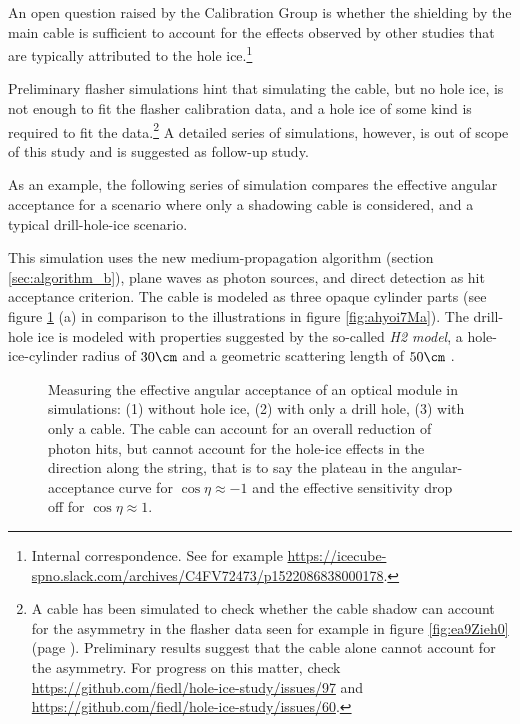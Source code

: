 An open question raised by the \icecube Calibration Group is whether the shielding by the main cable is sufficient to account for the effects observed by other studies that are typically attributed to the hole ice.\footnote{Internal correspondence. See for example \url{https://icecube-spno.slack.com/archives/C4FV72473/p1522086838000178}.}

Preliminary flasher simulations hint that simulating the cable, but no hole ice, is not enough to fit the flasher calibration data, and a hole ice of some kind is required to fit the data.\footnote{A cable has been simulated to check whether the cable shadow can account for the asymmetry in the flasher data seen for example in figure \ref{fig:ea9Zieh0} (page \pageref{fig:ea9Zieh0}). Preliminary results suggest that the cable alone cannot account for the asymmetry. For progress on this matter, check \url{https://github.com/fiedl/hole-ice-study/issues/97} and \url{https://github.com/fiedl/hole-ice-study/issues/60}.} A detailed series of simulations, however, is out of scope of this study and is suggested as follow-up study.\followup

As an example, the following series of simulation compares the effective angular acceptance for a scenario where only a shadowing cable is considered, and a typical drill-hole-ice scenario.


This simulation uses the new medium-propagation algorithm (section \ref{sec:algorithm_b}), plane waves as photon sources, and direct detection as hit acceptance criterion. The cable is modeled as three opaque cylinder parts (see figure \ref{fig:Ohw1aibu} (a) in comparison to the illustrations in figure \ref{fig:ahyoi7Ma}). The drill-hole ice is modeled with properties suggested by the so-called \textit{H2 model}, a hole-ice-cylinder radius of $30\cm$ and a geometric scattering length of $50\cm$ \cite{holeicestudieswithyag}.

\begin{figure}[htbp]
  \hfill
  \hfill
  \caption{Measuring the effective angular acceptance of an optical module in simulations: (1) without hole ice, (2) with only a drill hole, (3) with only a cable. The cable can account for an overall reduction of photon hits, but cannot account for the hole-ice effects in the direction along the string, that is to say the plateau in the angular-acceptance curve for $\cos \eta \approx -1$ and the effective sensitivity drop off for $\cos \eta \approx 1$.}
  \label{fig:Ohw1aibu}
\end{figure}

